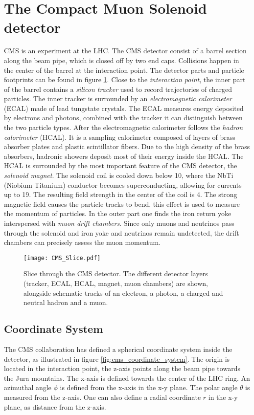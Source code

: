 \section{The Compact Muon Solenoid detector}
CMS is an experiment at the LHC. The CMS detector consist of a barrel section along the beam pipe, which is closed off by two end caps. Collisions happen in the center of the barrel at the interaction point. 
The detector parts and particle footprints can be found in figure \ref{fig:cms_slice}.
Close to the \emph{interaction point}, the inner part of the barrel contains a \emph{silicon tracker} used to record trajectories of charged particles. 
The inner tracker is surrounded by an \emph{electromagnetic calorimeter} (ECAL) made of lead tungstate crystals. The ECAL measures energy deposited by electrons and photons, combined with the tracker it can distinguish between the two particle types. 
After the electromagnetic calorimeter follows the \emph{hadron calorimeter} (HCAL). It is a sampling calorimeter composed of layers of brass absorber plates and plastic scintillator fibers. Due to the high density of the brass absorbers, hadronic showers deposit most of their energy inside the HCAL.
The HCAL is surrounded by the most important feature of the CMS detector, the \emph{solenoid magnet}. The solenoid coil is cooled down below \unit{10}{\kelvin}, where the NbTi (Niobium-Titanium) conductor becomes superconducting, allowing for currents up to \unit{19}{\kilo\ampere}. The resulting field strength in the center of the coil is \unit{4}{\tesla}. The strong magnetic field causes the particle tracks to bend, this effect is used to measure the momentum of particles.
In the outer part one finds the iron return yoke interspersed with \emph{muon drift chambers}. Since only muons and neutrinos pass through the solenoid and iron yoke and neutrinos remain undetected, the drift chambers can precisely assess the muon momentum.\cite{Co2008CMS}

\begin{figure}[htbp]
	\center
	\texttt{[image: CMS\_Slice.pdf]}
	\caption{Slice through the CMS detector. The different detector layers (tracker, ECAL, HCAL, magnet, muon chambers) are shown, alongside schematic tracks of an electron, a photon, a charged and neutral hadron and a muon.\cite[modified]{Barney2011CMS}}
	\label{fig:cms_slice}
\end{figure}

\subsection{Coordinate System}
The CMS collaboration has defined a spherical coordinate system inside the detector, as illustrated in figure \ref{fig:cms_coordinate_system}. The origin is located in the interaction point, the z-axis points along the beam pipe towards the Jura mountains. The x-axis is defined towards the center of the LHC ring. An azimuthal angle $\phi$ is defined from the x-axis in the x-y plane. The polar angle $\theta$ is measured from the z-axis. One can also define a radial coordinate $r$ in the x-y plane, as distance from the z-axis.\cite[p. 2]{Co2008CMS} 

